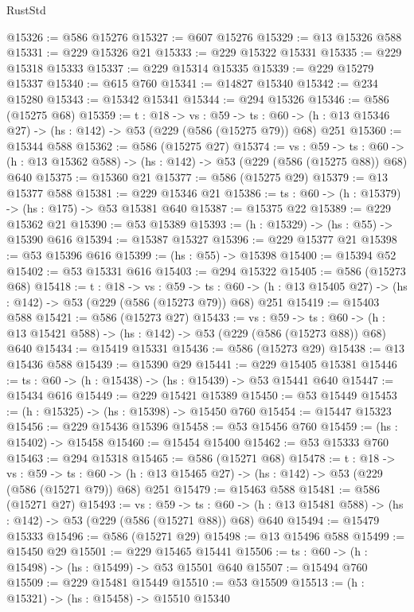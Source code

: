 \begin{lexlean}{RustStd}
\begin{coremodule}
@15326 := @586 @15276
@15327 := @607 @15276
@15329 := @13 @15326 @588
@15331 := @229 @15326 @21
@15333 := @229 @15322 @15331
@15335 := @229 @15318 @15333
@15337 := @229 @15314 @15335
@15339 := @229 @15279 @15337
@15340 := @615 @760
@15341 := @14827 @15340
@15342 := @234 @15280
@15343 := @15342 @15341
@15344 := @294 @15326
@15346 := @586 (@15275 @68)
@15359 := {t : @18} ->
  {vs : @59} ->
  {ts : @60} -> (h : @13 @15346 @27) -> (hs : @142) -> @53 (@229 (@586 (@15275 @79)) @68) @251
@15360 := @15344 @588
@15362 := @586 (@15275 @27)
@15374 := {vs : @59} ->
  {ts : @60} -> (h : @13 @15362 @588) -> (hs : @142) -> @53 (@229 (@586 (@15275 @88)) @68) @640
@15375 := @15360 @21
@15377 := @586 (@15275 @29)
@15379 := @13 @15377 @588
@15381 := @229 @15346 @21
@15386 := {ts : @60} -> (h : @15379) -> (hs : @175) -> @53 @15381 @640
@15387 := @15375 @22
@15389 := @229 @15362 @21
@15390 := @53 @15389
@15393 := (h : @15329) -> (hs : @55) -> @15390 @616
@15394 := @15387 @15327
@15396 := @229 @15377 @21
@15398 := @53 @15396 @616
@15399 := (hs : @55) -> @15398
@15400 := @15394 @52
@15402 := @53 @15331 @616
@15403 := @294 @15322
@15405 := @586 (@15273 @68)
@15418 := {t : @18} ->
  {vs : @59} ->
  {ts : @60} -> (h : @13 @15405 @27) -> (hs : @142) -> @53 (@229 (@586 (@15273 @79)) @68) @251
@15419 := @15403 @588
@15421 := @586 (@15273 @27)
@15433 := {vs : @59} ->
  {ts : @60} -> (h : @13 @15421 @588) -> (hs : @142) -> @53 (@229 (@586 (@15273 @88)) @68) @640
@15434 := @15419 @15331
@15436 := @586 (@15273 @29)
@15438 := @13 @15436 @588
@15439 := @15390 @29
@15441 := @229 @15405 @15381
@15446 := {ts : @60} -> (h : @15438) -> (hs : @15439) -> @53 @15441 @640
@15447 := @15434 @616
@15449 := @229 @15421 @15389
@15450 := @53 @15449
@15453 := (h : @15325) -> (hs : @15398) -> @15450 @760
@15454 := @15447 @15323
@15456 := @229 @15436 @15396
@15458 := @53 @15456 @760
@15459 := (hs : @15402) -> @15458
@15460 := @15454 @15400
@15462 := @53 @15333 @760
@15463 := @294 @15318
@15465 := @586 (@15271 @68)
@15478 := {t : @18} ->
  {vs : @59} ->
  {ts : @60} -> (h : @13 @15465 @27) -> (hs : @142) -> @53 (@229 (@586 (@15271 @79)) @68) @251
@15479 := @15463 @588
@15481 := @586 (@15271 @27)
@15493 := {vs : @59} ->
  {ts : @60} -> (h : @13 @15481 @588) -> (hs : @142) -> @53 (@229 (@586 (@15271 @88)) @68) @640
@15494 := @15479 @15333
@15496 := @586 (@15271 @29)
@15498 := @13 @15496 @588
@15499 := @15450 @29
@15501 := @229 @15465 @15441
@15506 := {ts : @60} -> (h : @15498) -> (hs : @15499) -> @53 @15501 @640
@15507 := @15494 @760
@15509 := @229 @15481 @15449
@15510 := @53 @15509
@15513 := (h : @15321) -> (hs : @15458) -> @15510 @15340

\end{coremodule}
\end{lexlean}
